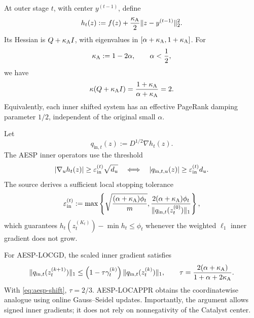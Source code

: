 At outer stage $t$, with center $y^{(t-1)}$, define
\begin{equation}
  h_t(z):=f(z)+\frac{\kappa_{\rm A}}2\lVert z-y^{(t-1)}\rVert_2^2.
  \label{eq:aesp-ht}
\end{equation}
Its Hessian is $Q+\kappa_{\rm A}I$, with eigenvalues in
$[\alpha+\kappa_{\rm A},1+\kappa_{\rm A}]$.  For
\begin{equation}
  \kappa_{\rm A}:=1-2\alpha,
  \qquad \alpha<\frac12,
  \label{eq:aesp-shift}
\end{equation}
we have
\begin{equation}
  \kappa(Q+\kappa_{\rm A}I)
  =\frac{1+\kappa_{\rm A}}{\alpha+\kappa_{\rm A}}=2.
  \label{eq:aesp-condition-two}
\end{equation}
Equivalently, each inner shifted system has an effective PageRank damping
parameter $1/2$, independent of the original small $\alpha$.

Let
\begin{equation}
  q_{\mathrm{in},t}(z):=D^{1/2}\nabla h_t(z).
  \label{eq:aesp-inner-q}
\end{equation}
The AESP inner operators use the threshold
\begin{equation}
  \left\lvert \nabla_u h_t(z) \right\rvert\geq\varepsilon_{\mathrm{in}}^{(t)}\sqrt{d_u}
  \quad\Longleftrightarrow\quad
  \left\lvert q_{\mathrm{in},t,u}(z) \right\rvert\geq\varepsilon_{\mathrm{in}}^{(t)}d_u.
  \label{eq:aesp-inner-active}
\end{equation}
The source derives a sufficient local stopping tolerance
\begin{equation}
  \varepsilon_{\mathrm{in}}^{(t)}
  :=\max\left\{
    \sqrt{\frac{(\alpha+\kappa_{\rm A})\phi_t}{m}},
    \frac{2(\alpha+\kappa_{\rm A})\phi_t}
         {\lVert q_{\mathrm{in},t}(z_t^{(0)})\rVert_1}
  \right\},
  \label{eq:aesp-eps-t}
\end{equation}
which guarantees
$h_t(z_t^{(K_t)})-\min h_t\leq\phi_t$ whenever the weighted
$\ell_1$ inner gradient does not grow.

For AESP-LOCGD, the scaled inner gradient satisfies
\begin{equation}
  \lVert q_{\mathrm{in},t}(z_t^{(k+1)})\rVert_1
  \leq
  \left(1-\tau\gamma_t^{(k)}\right)
  \lVert q_{\mathrm{in},t}(z_t^{(k)})\rVert_1,
  \qquad
  \tau=\frac{2(\alpha+\kappa_{\rm A})}
              {1+\alpha+2\kappa_{\rm A}}.
  \label{eq:aesp-inner-contraction}
\end{equation}
With \cref{eq:aesp-shift}, $\tau=2/3$.  AESP-LOCAPPR obtains the
coordinatewise analogue using online Gauss--Seidel updates.  Importantly, the
argument allows signed inner gradients; it does not rely on nonnegativity of
the Catalyst center.

